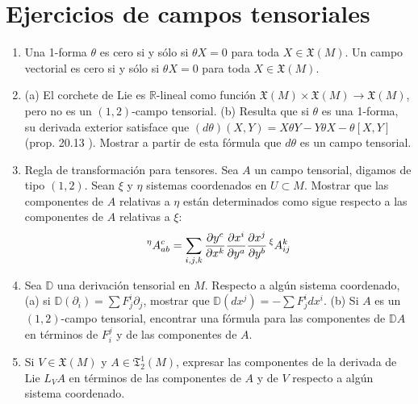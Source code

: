 \documentclass[spanish]{book}
\theoremstyle{definition}
\newcommand{\R}{\mathbb{R}}
\newcommand{\D}{\mathbb{D}}
\newcommand{\X}{\mathfrak{X}}
\newcommand{\T}{\mathfrak{T}}
\begin{document}
	\section{Ejercicios de campos tensoriales}
	\begin{enumerate}
		\item Una 1-forma $\theta$ es cero si y sólo si $\theta X=0$ para toda $X\in\X(M)$. Un campo vectorial es cero si y sólo si $\theta X=0$ para toda $X\in\X(M)$.
		
		\item (a) El corchete de Lie es $\R$-lineal como función $\X(M)\times\X(M)\to\X(M)$, pero no es un $(1,2)$-campo tensorial. (b) Resulta que si $\theta$ es una 1-forma, su derivada exterior satisface que $(d\theta)(X,Y)=X\theta Y-Y\theta X-\theta[X,Y]$ (prop. 20.13 \cite{Loring}). Mostrar a partir de esta fórmula que $d\theta$ es un campo tensorial.
		
		\item Regla de transformación para tensores. Sea $A$ un campo tensorial, digamos de tipo $(1,2)$. Sean $\xi$ y $\eta$ sistemas coordenados en $U\subset M$. Mostrar que las componentes de $A$ relativas a $\eta$ están determinados como sigue respecto a las componentes de $A$ relativas a $\xi$:
		\[\prescript{\eta}{}{A}^c_{ab}=\sum_{i,j,k}\frac{\partial y^c}{\partial x^k}\frac{\partial x^i}{\partial y^a}\frac{\partial x^j}{\partial y^b}\prescript{\xi}{}{A}^k_{ij}\]
		
		\item Sea $\D$ una derivación tensorial en $M$. Respecto a algún sistema coordenado, (a) si $\D(\partial_i)=\sum F^i_j\partial_j$, mostrar que $\D(dx^j)=-\sum F^i_jdx^i$. (b) Si $A$ es un $(1,2)$-campo tensorial, encontrar una fórmula para las componentes de $\D A$ en términos de $F^j_i$ y de las componentes de $A$.
		
		\item Si $V\in\X(M)$ y $A\in\T^1_2(M)$, expresar las componentes de la derivada de Lie $L_VA$ en términos de las componentes de $A$ y de $V$ respecto a algún sistema coordenado.
	\end{enumerate}
	
\end{document}
